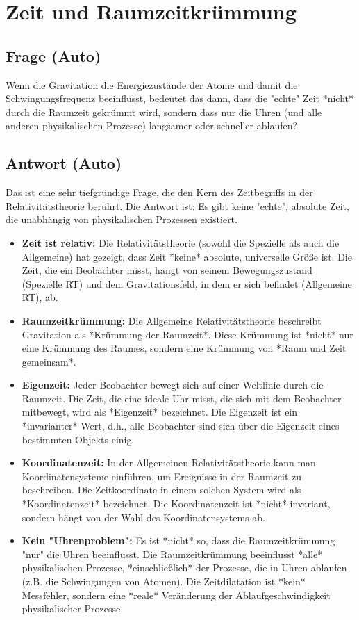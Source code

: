 \documentclass{article}
\begin{document}
	\section{Zeit und Raumzeitkrümmung}
	
	\subsection{Frage (Auto)}
	Wenn die Gravitation die Energiezustände der Atome und damit die Schwingungsfrequenz beeinflusst, bedeutet das dann, dass die "echte" Zeit *nicht* durch die Raumzeit gekrümmt wird, sondern dass nur die Uhren (und alle anderen physikalischen Prozesse) langsamer oder schneller ablaufen?
	
	\subsection{Antwort (Auto)}
	Das ist eine sehr tiefgründige Frage, die den Kern des Zeitbegriffs in der Relativitätstheorie berührt. Die Antwort ist: Es gibt keine "echte", absolute Zeit, die unabhängig von physikalischen Prozessen existiert.
	\begin{itemize}
		\item \textbf{Zeit ist relativ:} Die Relativitätstheorie (sowohl die Spezielle als auch die Allgemeine) hat gezeigt, dass Zeit *keine* absolute, universelle Größe ist. Die Zeit, die ein Beobachter misst, hängt von seinem Bewegungszustand (Spezielle RT) und dem Gravitationsfeld, in dem er sich befindet (Allgemeine RT), ab.
		\item \textbf{Raumzeitkrümmung:} Die Allgemeine Relativitätstheorie beschreibt Gravitation als *Krümmung der Raumzeit*. Diese Krümmung ist *nicht* nur eine Krümmung des Raumes, sondern eine Krümmung von *Raum und Zeit gemeinsam*.
		\item \textbf{Eigenzeit:} Jeder Beobachter bewegt sich auf einer Weltlinie durch die Raumzeit. Die Zeit, die eine ideale Uhr misst, die sich mit dem Beobachter mitbewegt, wird als *Eigenzeit* bezeichnet. Die Eigenzeit ist ein *invarianter* Wert, d.h., alle Beobachter sind sich über die Eigenzeit eines bestimmten Objekts einig.
		\item \textbf{Koordinatenzeit:} In der Allgemeinen Relativitätstheorie kann man Koordinatensysteme einführen, um Ereignisse in der Raumzeit zu beschreiben. Die Zeitkoordinate in einem solchen System wird als *Koordinatenzeit* bezeichnet. Die Koordinatenzeit ist *nicht* invariant, sondern hängt von der Wahl des Koordinatensystems ab.
		\item \textbf{Kein "Uhrenproblem":} Es ist *nicht* so, dass die Raumzeitkrümmung "nur" die Uhren beeinflusst. Die Raumzeitkrümmung beeinflusst *alle* physikalischen Prozesse, *einschließlich* der Prozesse, die in Uhren ablaufen (z.B. die Schwingungen von Atomen). Die Zeitdilatation ist *kein* Messfehler, sondern eine *reale* Veränderung der Ablaufgeschwindigkeit physikalischer Prozesse.
		
	\end{itemize}
	
\end{document}
